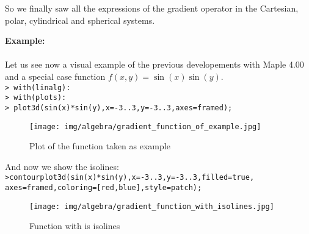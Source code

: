 	So we finally saw all the expressions of the gradient operator in the Cartesian, polar, cylindrical and spherical systems.
	
	\begin{tcolorbox}[colframe=black,colback=white,sharp corners]
	\textbf{{\Large {}}Example:}\\\\
	Let us see now a visual example of the previous developements with Maple 4.00 and a special case function $f(x,y)=\sin(x)\sin(y)$.\\
	
	\texttt{> with(linalg):\\
	> with(plots):\\
	> plot3d(sin(x)*sin(y),x=-3..3,y=-3..3,axes=framed);}\\
	\begin{figure}[H]
		\centering
		\texttt{[image: img/algebra/gradient\_function\_of\_example.jpg]}
		\caption[]{Plot of the function taken as example}
	\end{figure}
	And now we show the isolines:\\
	
	\texttt{>contourplot3d(sin(x)*sin(y),x=-3..3,y=-3..3,filled=true,\\
	axes=framed,coloring=[red,blue],style=patch);}
	\begin{figure}[H]
		\centering
		\texttt{[image: img/algebra/gradient\_function\_with\_isolines.jpg]}
		\caption[]{Function with is isolines}
	\end{figure}
	\end{tcolorbox}
	
